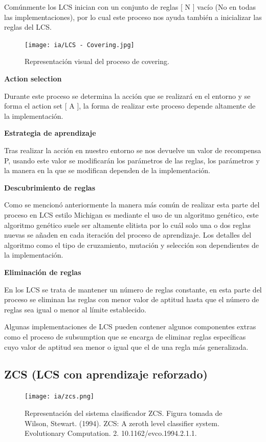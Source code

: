 \documentclass[11pt,fleqn]{book} %
\begin{document}
Comúnmente los LCS inician con un conjunto de reglas [ N ] vacío (No en todas las implementaciones), por lo cual este proceso nos ayuda también a inicializar las reglas del LCS.

\begin{figure}[ht]
\centering\texttt{[image: ia/LCS - Covering.jpg]}
\caption{Representación visual del proceso de covering.}
\label{fig:LCS - Covering} 
\end{figure}

\FloatBarrier
\textbf{Action selection}

Durante este proceso se determina la acción que se realizará en el entorno y se forma el action set [ A ], la forma de realizar este proceso depende altamente de la implementación.

\textbf{Estrategia de aprendizaje}

Tras realizar la acción en nuestro entorno se nos devuelve un valor de recompensa P, usando este valor se modificarán los parámetros de las reglas, los parámetros y la manera en la que se modifican dependen de la implementación.

\textbf{Descubrimiento de reglas}

Como se mencionó anteriormente la manera más común de realizar esta parte del proceso en LCS estilo Michigan es mediante el uso de un algoritmo genético, este algoritmo genético suele ser altamente elitista por lo cuál solo una o dos reglas nuevas se añaden en cada iteración del proceso de aprendizaje. Los detalles del algoritmo como el tipo de cruzamiento, mutación y selección son dependientes de la implementación.

\textbf{Eliminación de reglas}

En los LCS se trata de mantener un número de reglas constante, en esta parte del proceso se eliminan las reglas con menor valor de aptitud hasta que el número de reglas sea igual o menor al límite establecido.

Algunas implementaciones de LCS pueden contener algunos componentes extras como el proceso de subsumption que se encarga de eliminar reglas específicas cuyo valor de aptitud sea menor o igual que el de una regla más generalizada.

\clearpage
\subsection{ZCS (LCS con aprendizaje reforzado)}
\begin{figure}[ht]
\centering\texttt{[image: ia/zcs.png]}
\caption{Representación del sistema clasificador ZCS. Figura tomada de Wilson, Stewart. (1994). ZCS: A zeroth level classifier system. Evolutionary Computation. 2. 10.1162/evco.1994.2.1.1. \cite{wilste_zcs}}
\label{fig:zcs} 
\end{figure}
\end{document}
